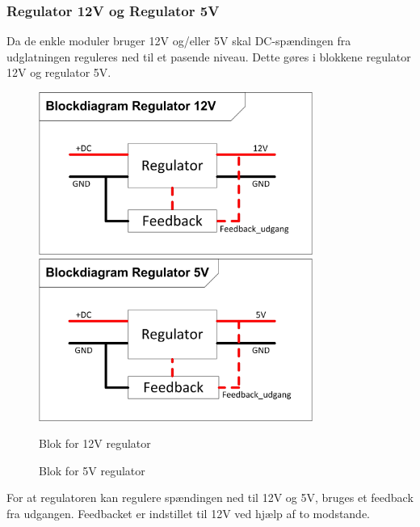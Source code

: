 \subsubsection{Regulator 12V og Regulator 5V}
Da de enkle moduler bruger 12V og/eller 5V skal DC-spændingen fra udglatningen reguleres ned til et pasende niveau. Dette gøres i blokkene regulator 12V og regulator 5V.
\begin{figure}[H]
	\centering
	\begin{minipage}[b]{0.48\textwidth}\centering
	\includegraphics[width=0.80\textwidth]{billeder/Regulering_12VBlok}
	\end{minipage}
	\begin{minipage}[b]{0.48\textwidth}\centering
	\includegraphics[width=0.80\textwidth]{billeder/Regulering_5VBlok}
	\end{minipage}
	\begin{minipage}[t]{0.48\textwidth}
	\caption{Blok for 12V regulator}
	\label{fig:Regulering_12VBlok}
	\end{minipage}
	\begin{minipage}[t]{0.48\textwidth}
	\caption{Blok for 5V regulator}
	\label{fig:Regulering_5VBlok}
	\end{minipage}
	\end{figure}
For at regulatoren kan regulere spændingen ned til 12V og 5V, bruges et feedback fra udgangen. Feedbacket er indstillet til 12V ved hjælp af to modstande. \\

